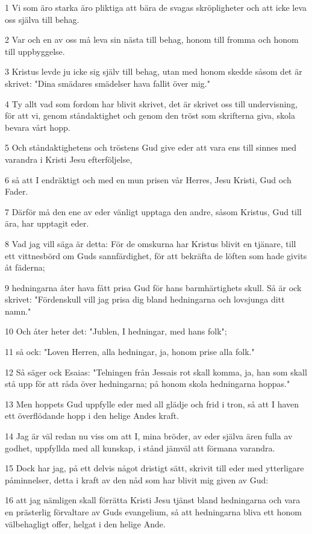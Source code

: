 \par 1 Vi som äro starka äro pliktiga att bära de svagas skröpligheter och att icke leva oss själva till behag.
\par 2 Var och en av oss må leva sin nästa till behag, honom till fromma och honom till uppbyggelse.
\par 3 Kristus levde ju icke sig själv till behag, utan med honom skedde såsom det är skrivet: "Dina smädares smädelser hava fallit över mig."
\par 4 Ty allt vad som fordom har blivit skrivet, det är skrivet oss till undervisning, för att vi, genom ståndaktighet och genom den tröst som skrifterna giva, skola bevara vårt hopp.
\par 5 Och ståndaktighetens och tröstens Gud give eder att vara ens till sinnes med varandra i Kristi Jesu efterföljelse,
\par 6 så att I endräktigt och med en mun prisen vår Herres, Jesu Kristi, Gud och Fader.
\par 7 Därför må den ene av eder vänligt upptaga den andre, såsom Kristus, Gud till ära, har upptagit eder.
\par 8 Vad jag vill säga är detta: För de omskurna har Kristus blivit en tjänare, till ett vittnesbörd om Guds sannfärdighet, för att bekräfta de löften som hade givits åt fäderna;
\par 9 hedningarna åter hava fått prisa Gud för hans barmhärtighets skull. Så är ock skrivet: "Fördenskull vill jag prisa dig bland hedningarna och lovsjunga ditt namn."
\par 10 Och åter heter det: "Jublen, I hedningar, med hans folk";
\par 11 så ock: "Loven Herren, alla hedningar, ja, honom prise alla folk."
\par 12 Så säger ock Esaias: "Telningen från Jessais rot skall komma, ja, han som skall stå upp för att råda över hedningarna; på honom skola hedningarna hoppas."
\par 13 Men hoppets Gud uppfylle eder med all glädje och frid i tron, så att I haven ett överflödande hopp i den helige Andes kraft.
\par 14 Jag är väl redan nu viss om att I, mina bröder, av eder själva ären fulla av godhet, uppfyllda med all kunskap, i stånd jämväl att förmana varandra.
\par 15 Dock har jag, på ett delvis något dristigt sätt, skrivit till eder med ytterligare påminnelser, detta i kraft av den nåd som har blivit mig given av Gud:
\par 16 att jag nämligen skall förrätta Kristi Jesu tjänst bland hedningarna och vara en prästerlig förvaltare av Guds evangelium, så att hedningarna bliva ett honom välbehagligt offer, helgat i den helige Ande.
